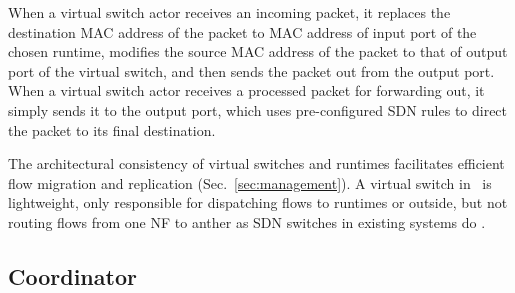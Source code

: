 When a virtual switch actor receives an incoming packet, it replaces the destination MAC address of the packet to MAC address of input port of the chosen runtime, modifies the source MAC address of the packet to that of output port of the virtual switch, and then sends the packet out from the output port. When a virtual switch actor receives a processed packet for forwarding out, %
 it simply sends it to the output port, which uses pre-configured SDN rules to direct the packet to its final destination. %


The architectural consistency of virtual switches and runtimes facilitates efficient flow migration and replication (Sec.~\ref{sec:management}). %
 A virtual switch in \nfactor~is lightweight, only responsible for dispatching flows to runtimes or outside, but not routing flows from one NF to anther as SDN switches in existing systems do \cite{gember2012stratos, gember2015opennf}.





\subsection{Coordinator}
\label{sec:coordinator}

